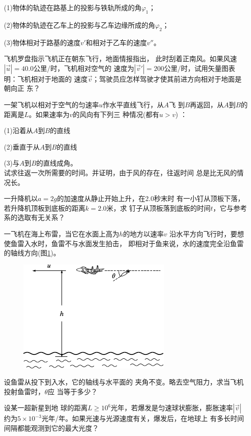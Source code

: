 \begin{exercises}
(1)物体的轨迹在路基上的投影与铁轨所成的角$ \varphi _1 $；

(2)物体的轨迹在乙车上的投影与乙车边缘所成的角$ \varphi _2 $；

(3)物体相对于路基的速度$ v' $和相对于乙车的速度$ v'' $。

\exercise 飞机罗盘指示飞机正在朝东飞行，地面情报指出，
此时刮着正南风。如果风速$ | \vec{u} | = 4 0 . 0  $公里/时，飞机相对空气的
速度为$ | \vec{v} ' | = 2 0 0  $公里/时，试用矢量图表明：飞机相对于地面的
速度$\vec{v}$；驾驶员应怎样驾驶才使其前进方向相对于地面是朝向正
东？

\exercise 一架飞机以相对于空气的匀速率$u$作水平直线飞行，从$A$飞
到$B$再返回，从$A$到$B$的距离是$L$。如果速率为$v$的风向有下列三
种情况(都有$ u > v$)  ：

(1)沿着从$A$到$B$的直线

(2)垂直于从$A$到$B$的直线

(3)与$A$到$B$的直线成角。\\
试求往返一次所需要的时间。并证明，由于风的存在，往返时间
总是比无风的情况长。

\exercise 一升降机以$ a = 2 g  $的加速度从静止开始上升，在2.0秒末时
有一小钉从顶板下落，若升降机顶板到底板的距离$ k = 2 . 0  $米，求
钉子从顶板落到底板的时间$t$，它与参考系的选取有无关系？

\exercise 一飞机在海上布雷，当它在水面上高为$h$的地方以速率$v$
沿水平方向飞行时，要想使鱼雷入水时，鱼雷不与水面发生拍击，
即相对于鱼来说，水的速度完全沿鱼雷的轴线方向(图\ref{fig:02.18})。
\begin{figure}
  \includegraphics{figure/fig02.18}
  \caption{}
  \label{fig:02.18}
\end{figure}
设鱼雷从投下到入水，它的轴线与水平面的
夹角不变。略去空气阻力，求当飞机投射鱼雷时，$\theta$应
当等于多少？

\exercise 设某一超新星到地
球的距离$ L \geqslant 1 0 ^ { 6 }  $光年，若爆发是匀速球状膨胀，膨胀速率$|\vec{v}|$约为$5 \times 1 0 ^ { - 3 }  $光年/年。如果光速与光源速度有关，爆发后，在地球上
有多长时间间隔都能观测到它的最大光度？


\end{exercises}
